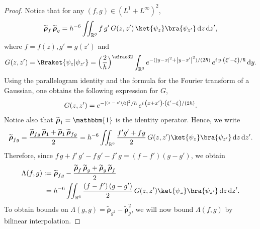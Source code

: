\documentclass[10pt]{amsart}
\newcommand{\psfrac}[2]{\sfrac{(#1)}{#2}}
\newcommand {\an}[1] {\lvert #1\rvert}
\let\mathds\mathbbm
\theoremstyle{definition}
\newcommand {\RR} {\mathbb R}
\newcommand {\Rd} {\RR^3}
\newcommand {\RRd} {\RR^6}
\let\lt\left
\let\rt\right
\renewcommand {\(} {\lt(}
\renewcommand {\)} {\rt)}
\newcommand {\n}[1] {\lt\lvert #1 \rt\rvert}
\renewcommand {\d} {\mathop{}\!\mathrm{d}}
\newcommand {\intd} {\int_{\Rd}}
\newcommand {\iintd} {\iint_{\RRd}}
\newcommand {\Inprod}[2] {\Braket{#1 | #2}}
\newcommand {\op} {\boldsymbol{\rho}}
\begin{document}
\begin{proof}
Notice that for any $(f,g)\in (L^1+ L^\infty)^2$,
\begin{equation*}
\widetilde{\op}_{f}\,\widetilde{\op}_{g} = h^{-6} \iintd f\,g' \,G(z,z') \, \ket{\psi_{z}}\bra{\psi_{z'}} \d z \d z',
\end{equation*}
where $f = f(z), g' = g(z')$ and
\begin{equation*}
G(z,z') = \Inprod{\psi_z}{\psi_{z'}} = \Bigl(\frac{2}{h}\Bigr)^{\sfrac32} \intd e^{-(\n{y-x}^2+\n{y-x'}^2)/(2\hbar)}\, e^{i\,y\cdot\(\xi'-\xi\)/\hbar} \d y.
\end{equation*}
Using the parallelogram identity and the formula for the Fourier transform of a Gaussian, one obtains the following expression for $G$,
\begin{equation*}
G(z,z')
= e^{-\an{\psfrac{z-z'}{2}}^2/\hbar}\, e^{i\,\(x+x'\)\cdot\(\xi'-\xi\)/(2\hbar)}.
\end{equation*}
Notice also that $\widetilde{\op}_1 = \mathds{1}$ is the identity operator. Hence, we write
\[
\widetilde{\op}_{fg} = \frac{\widetilde{\op}_{fg}\, \widetilde{\op}_1 + \widetilde{\op}_1\, \widetilde{\op}_{fg}}{2} = h^{-6} \iintd \frac{f'g'+fg}{2} \,G(z,z') \ket{\psi_{z}}\bra{\psi_{z'}} \d z \d z'.
\]
Therefore, since $f\,g + f'\,g' - f\,g' - f'\,g = \(f-f'\) \(g-g'\)$, we obtain
\begin{align*}
\Lambda(f,g) &:= \widetilde{\op}_{fg} - \frac{\widetilde{\op}_f\,\widetilde{\op}_g + \widetilde{\op}_g\,\widetilde{\op}_f}{2}
\\
&\hphantom{:}= h^{-6} \iintd \frac{\(f-f'\)\(g-g'\)}{2} \,G(z,z') \ket{\psi_{z}}\bra{\psi_{z'}} \d z \d z'.
\end{align*}
To obtain bounds on $\Lambda(g,g) = \widetilde{\op}_{g^2} - \widetilde{\op}_g^2$, we will now bound $\Lambda(f,g)$ by bilinear interpolation.


\end{proof}
\end{document}
